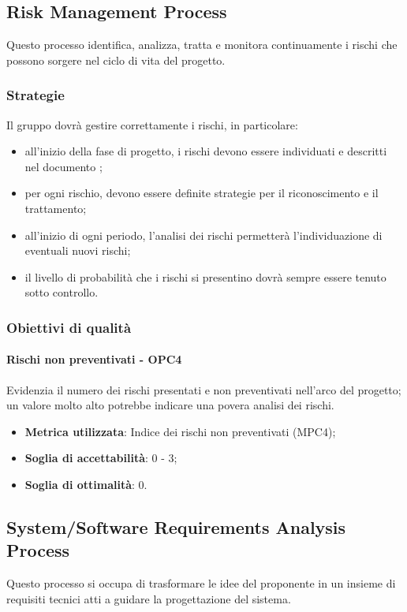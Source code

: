 \documentclass[PdQ.tex]{subfiles}
\begin{document}
	\subsection{Risk Management Process}
		Questo processo identifica, analizza, tratta e monitora continuamente i rischi che possono sorgere nel ciclo di vita del progetto.
		
		\subsubsection{Strategie}
			Il gruppo dovrà gestire correttamente i rischi, in particolare:
			\begin{itemize}
				\item all'inizio della fase di progetto, i rischi devono essere individuati e descritti nel documento \PPdocRP{};
				\item per ogni rischio, devono essere definite strategie per il riconoscimento e il trattamento;
				\item all'inizio di ogni periodo, l'analisi dei rischi permetterà l'individuazione di eventuali nuovi rischi;
				\item il livello di probabilità che i rischi si presentino dovrà sempre essere tenuto sotto controllo.
			\end{itemize}
			
		\subsubsection{Obiettivi di qualità}
			\paragraph{Rischi non preventivati - OPC4}
				Evidenzia il numero dei rischi presentati e non preventivati nell'arco del progetto; un valore molto alto potrebbe indicare una povera analisi dei rischi.
				\begin{itemize}
					\item \textbf{Metrica utilizzata}: Indice dei rischi non preventivati (MPC4);
					\item \textbf{Soglia di accettabilità}: 0 - 3;
					\item \textbf{Soglia di ottimalità}: 0.
				\end{itemize}

	\subsection{System/Software Requirements Analysis Process}
		Questo processo si occupa di trasformare le idee del proponente in un insieme di requisiti tecnici atti a guidare la progettazione del sistema.
		
\end{document}
